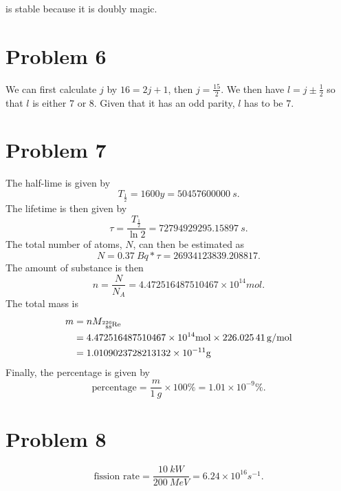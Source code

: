 \documentclass[a4paper]{article}
\theoremstyle{theorem}
\theoremstyle{definition}
\theoremstyle{lemma}
\theoremstyle{corollary}
\theoremstyle{remark}
\theoremstyle{axiom}
\begin{document}
 is stable because it is doubly magic.

\section*{Problem 6}

We can first calculate \(j\) by \(16 = 2j + 1\),
then \(j = \frac{15}{2}\).
We then have \(l = j\pm \frac{1}{2}\) so that \(l\) is either \(7\) or \(8\).
Given that it has an odd parity,
\(l\) has to be \(7\).

\section*{Problem 7}

The half-lime is given by
\[
  T_{\frac{1}{2}} = 1600\si{y} = \SI{50457600000}{s}
.\]
The lifetime is then given by
\[
  \tau = \frac{T_{\frac{1}{2}}}{\ln 2} = \SI{72794929295.15897}{s}
.\]
The total number of  atoms, \(N\), can then be estimated as
\[
  N = \SI{0.37}{Bq} * \tau = 26934123839.208817
.\]
The amount of substance is then
\[
  n = \frac{N}{N_A} = 4.472516487510467\times 10^{14}\si{mol}
.\]
The total mass is
\begin{align*}
  m &= nM_{\ce{^226_88Re}} \\
    &= 4.472516487510467\times 10^{14}\si{mol} \times \SI{226.02541}{g/mol} \\
    &= 1.0109023728213132\times 10^{-11}\si{g}
\end{align*}
Finally, the percentage is given by
\[
  \text{percentage} = \frac{m}{\SI{1}{g}} \times 100\% = 1.01\times 10^{-9}\%
.\]

\section*{Problem 8}

\[
  \text{fission rate} = \frac{\SI{10}{kW}}{\SI{200}{MeV}} = 6.24\times 10^{16}\si{s^{-1}}
.\]
\end{document}
